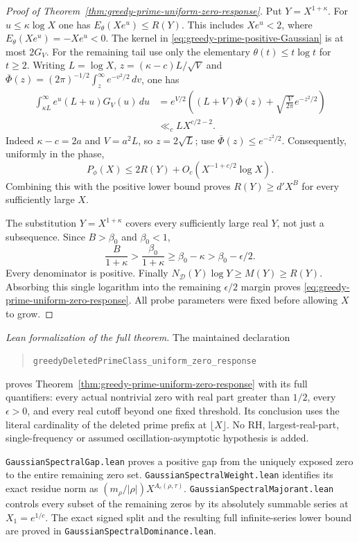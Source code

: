 \documentclass[11pt]{article}
\theoremstyle{definition}
\begin{document}
\begin{proof}[Proof of Theorem~\ref{thm:greedy-prime-uniform-zero-response}]
Put $Y=X^{1+\kappa}$.
For $u\le\kappa\log X$ one has
$E_\theta(Xe^u)\le R(Y)$.
This includes $Xe^u<2$, where $E_\theta(Xe^u)=-Xe^u<0$.
The kernel in \eqref{eq:greedy-prime-positive-Gaussian} is at most $2G_V$.
For the remaining tail use only the elementary
$\theta(t)\le t\log t$ for $t\ge2$.
Writing $L=\log X$, $z=(\kappa-c)L/\sqrt V$ and
$\overline\Phi(z)=(2\pi)^{-1/2}\int_z^\infty e^{-v^2/2}\,dv$, one has
\begin{equation}
 \begin{aligned}
 \int_{\kappa L}^\infty e^u(L+u)G_V(u)\,du
  &=e^{V/2}\left((L+V)\overline\Phi(z)
                  +\sqrt{\frac V{2\pi}}e^{-z^2/2}\right)\\
  &\ll_c L X^{c/2-2}.
 \end{aligned}
 \label{eq:greedy-prime-Gaussian-tail}
\end{equation}
Indeed $\kappa-c=2a$ and $V=a^2L$, so $z=2\sqrt L$;
use $\overline\Phi(z)\le e^{-z^2/2}$.
Consequently, uniformly in the phase,
\[
 P_\phi(X)\le2R(Y)+O_c(X^{-1+c/2}\log X).
\]
Combining this with the positive lower bound proves
$R(Y)\ge d'X^B$ for every sufficiently large $X$.

The substitution $Y=X^{1+\kappa}$ covers every sufficiently large real
$Y$, not just a subsequence.
Since $B>\beta_0$ and $\beta_0<1$,
\[
 \frac{B}{1+\kappa}>
 \frac{\beta_0}{1+\kappa}\ge\beta_0-\kappa
                                      >\beta_0-\epsilon/2.
\]
Every denominator is positive.
Finally
$N_{\mathcal D}(Y)\log Y\ge M(Y)\ge R(Y)$.
Absorbing this single logarithm into the remaining $\epsilon/2$
margin proves \eqref{eq:greedy-prime-uniform-zero-response}.
All probe parameters were fixed before allowing $X$ to grow.
\end{proof}

\emph{Lean formalization of the full theorem.}
The maintained declaration
\begin{quote}
\texttt{greedyDeletedPrimeClass\_uniform\_zero\_response}
\end{quote}
proves Theorem~\ref{thm:greedy-prime-uniform-zero-response} with its
full quantifiers: every actual nontrivial zero with real part greater
than $1/2$, every $\epsilon>0$, and every real cutoff beyond one fixed
threshold. Its conclusion uses the literal cardinality of the deleted
prime prefix at $\lfloor X\rfloor$. No RH, largest-real-part,
single-frequency or assumed oscillation-asymptotic hypothesis is added.

\texttt{Gaussian\allowbreak SpectralGap.lean} proves a positive gap from the
uniquely exposed zero to the entire remaining zero set.
\texttt{Gaussian\allowbreak SpectralWeight.lean} identifies its exact residue norm
as $(m_\rho/|\rho|)X^{A_c(\rho,\tau)}$.
\texttt{Gaussian\allowbreak SpectralMajorant.lean} controls every subset of the
remaining zeros by its absolutely summable series at $X_1=e^{1/c}$.
The exact signed split and the resulting full infinite-series lower
bound are proved in \texttt{Gaussian\allowbreak SpectralDominance.lean}.
\end{document}
